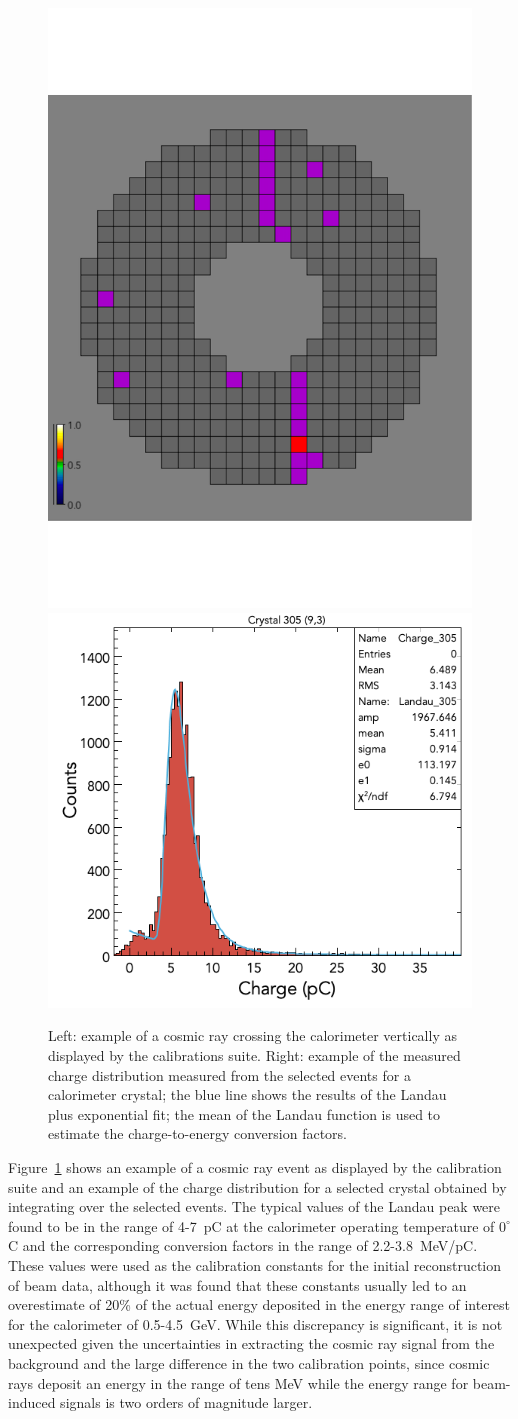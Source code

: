 \begin{figure}
\includegraphics[height=0.58\columnwidth]{fig/ftcal_cosmicview.pdf}
\includegraphics[height=0.5\columnwidth]{fig/ftcal_cosmiccharge.png}
\caption{Left: example of a cosmic ray crossing the calorimeter vertically as displayed by the calibrations suite.
  Right: example of the measured charge distribution measured from the selected events for a calorimeter crystal;
  the blue line shows the results of the Landau plus exponential fit; the mean of the Landau function is used to
  estimate the charge-to-energy conversion factors.}
\label{fig:ftcal_cosmic}
\end{figure}

Figure~\ref{fig:ftcal_cosmic} shows an example of a cosmic ray event as displayed by the calibration suite and an
example of the charge distribution for a selected crystal obtained by integrating over the selected events. The
typical values of the Landau peak were found to be in the range of 4-7~pC at the calorimeter operating temperature
of $0^\circ$C and the corresponding conversion factors in the range of 2.2-3.8~MeV/pC. These values were used as
the calibration constants for the initial reconstruction of beam data, although it was found that these constants
usually led to an overestimate of 20\% of the actual energy deposited in the energy range of interest for the
calorimeter of 0.5-4.5~GeV. While this discrepancy is significant, it is not unexpected given the uncertainties in
extracting the cosmic ray signal from the background and the 
large difference in the two calibration points, since cosmic rays deposit an energy in the range of tens MeV while the energy range  for beam-induced signals is two orders of magnitude larger.

